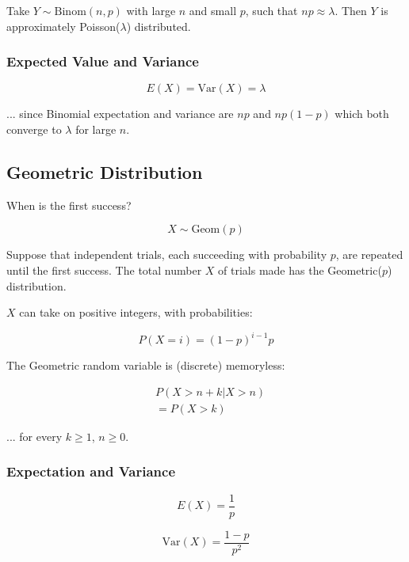 Take $Y \sim \text{Binom}(n,p)$ with large $n$ and small $p$, such that $np \approx \lambda$. Then $Y$ is  approximately Poisson($\lambda$) distributed.

\subsubsection*{Expected Value and Variance}

$$ E(X) = \text{Var}(X) = \lambda $$

... since Binomial expectation and variance are $np$ and $np(1-p)$ which both converge to $\lambda$ for large $n$.

\subsection*{Geometric Distribution}

When is the first success?

$$ X \sim \text{Geom}(p) $$

Suppose that independent trials, each succeeding with probability $p$, are repeated until the first success. The total number $X$ of trials made has the Geometric($p$) distribution.

$X$ can take on positive integers, with probabilities:

$$ P(X = i) = (1-p)^{i-1} p $$

The Geometric random variable is (discrete) memoryless:

\begin{align*}
      & P(X > n + k | X > n) \\
      & = P(X > k)
\end{align*}

... for every $k \geq 1$, $n \geq 0$.

\subsubsection*{Expectation and Variance}

$$ E(X) = \frac{1}{p} $$

$$ \text{Var}(X) = \frac{1-p}{p^2} $$